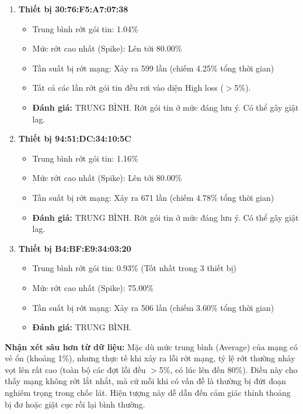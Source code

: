\documentclass{article} %
\begin{document}
\begin{enumerate}
    \item \textbf{Thiết bị 30:76:F5:A7:07:38}
    \begin{itemize}
        \item Trung bình rớt gói tin: 1.04\%
        \item Mức rớt cao nhất (Spike): Lên tới 80.00\%
        \item Tần suất bị rớt mạng: Xảy ra 599 lần (chiếm 4.25\% tổng thời gian)
        \item Tất cả các lần rớt gói tin đều rơi vào diện High loss ($>$5\%).
        \item \textbf{Đánh giá:} TRUNG BÌNH. Rớt gói tin ở mức đáng lưu ý. Có thể gây giật lag.
    \end{itemize}
    
    \item \textbf{Thiết bị 94:51:DC:34:10:5C}
    \begin{itemize}
        \item Trung bình rớt gói tin: 1.16\%
        \item Mức rớt cao nhất (Spike): Lên tới 80.00\%
        \item Tần suất bị rớt mạng: Xảy ra 671 lần (chiếm 4.78\% tổng thời gian)
        \item \textbf{Đánh giá:} TRUNG BÌNH. Rớt gói tin ở mức đáng lưu ý. Có thể gây giật lag.
    \end{itemize}
    
    \item \textbf{Thiết bị B4:BF:E9:34:03:20}
    \begin{itemize}
        \item Trung bình rớt gói tin: 0.93\% (Tốt nhất trong 3 thiết bị)
        \item Mức rớt cao nhất (Spike): 75.00\%
        \item Tần suất bị rớt mạng: Xảy ra 506 lần (chiếm 3.60\% tổng thời gian)
        \item \textbf{Đánh giá:} TRUNG BÌNH.
    \end{itemize}
\end{enumerate}

\textbf{Nhận xét sâu hơn từ dữ liệu:} Mặc dù mức trung bình (Average) của mạng có vẻ ổn (khoảng 1\%), nhưng thực tế khi xảy ra lỗi rớt mạng, tỷ lệ rớt thường nhảy vọt lên rất cao (toàn bộ các đợt lỗi đều $>$5\%, có lúc lên đến 80\%). Điều này cho thấy mạng không rớt lắt nhắt, mà cứ mỗi khi có vấn đề là thường bị đứt đoạn nghiêm trọng trong chốc lát. Hiện tượng này dễ dẫn đến cảm giác thỉnh thoảng bị đơ hoặc giật cục rồi lại bình thường.
\end{document}
